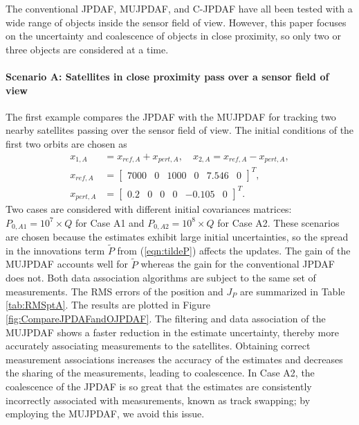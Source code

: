 \documentclass[letterpaper, 10pt, conference]{ieeeconf}
\newcommand{\refeqn}[1]{(\ref{eqn:#1})}
\begin{document}
The conventional JPDAF, MUJPDAF, and C-JPDAF have all been tested with a wide range of objects inside the sensor field of view.
However, this paper focuses on the uncertainty and coalescence of objects in close proximity, so only two or three objects are considered at a time.

\paragraph*{Scenario A: Satellites in close proximity pass over a sensor field of view}
The first example compares the JPDAF with the MUJPDAF for tracking two nearby satellites passing over the sensor field of view. The initial conditions of the first two orbits are chosen as
\begin{align}
x_{1,A}&=x_{ref,A}+x_{pert,A}, \quad x_{2,A}=x_{ref,A}-x_{pert,A},\nonumber
\\
x_{ref,A}&=\begin{bmatrix}7000 & 0 & 1000 & 0 & 7.546 & 0\end{bmatrix}^T,\nonumber
\\
x_{pert,A}&=\begin{bmatrix}
0.2 & 0 & 0 & 0 & -0.105 & 0
\end{bmatrix}^T.
\end{align}
Two cases are considered with different initial covariances matrices: $P_{0,A1}=10^7\times Q$ for Case A1 and $P_{0,A2}=10^8\times Q$ for Case A2.
These scenarios are chosen because the estimates exhibit large initial uncertainties, so the spread in the innovations term $\tilde P$ from \refeqn{tildeP} affects the updates.
The gain of the MUJPDAF accounts well for $\tilde P$ whereas the gain for the conventional JPDAF does not.
Both data association algorithms are subject to the same set of measurements.
The RMS errors of the position and $J_P$ are summarized in Table \ref{tab:RMSptA}.
The results are plotted in Figure \ref{fig:CompareJPDAFandOJPDAF}.
The filtering and data association of the MUJPDAF shows a faster reduction in the estimate uncertainty, thereby more accurately associating measurements to the satellites.
Obtaining correct measurement associations increases the accuracy of the estimates and decreases the sharing of the measurements, leading to coalescence.
In Case A2, the coalescence of the JPDAF is so great that the estimates are consistently incorrectly associated with measurements, known as track swapping; by employing the MUJPDAF, we avoid this issue.
\end{document}
